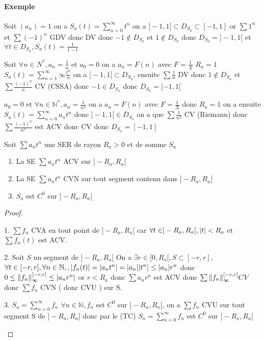 \documentclass[11pt,hidelinks]{book}
\theoremstyle{mytheoremstyle}
\theoremstyle{mytheoremstyle}
\theoremstyle{mytheoremstyle}
\theoremstyle{mytheoremstyle}
\theoremstyle{mytheoremstyle}
\theoremstyle{mytheoremstyle}
\theoremstyle{mytheoremstyle}
\theoremstyle{mytheoremstyle}
\theoremstyle{myproblemstyle}
\def\mbb#1{\mathbb{#1}}
\def\bN{\mbb{N}}
\def\is#1{\sum_{n=0}^\infty #1}
\def\iss#1#2{\sum_{n=#1}^\infty #2}
\def\ser{\sum a_n t^n}
\def\fn{\forall n \in \bN,}
\begin{document}
\begin{adjustwidth}{-2em}{-1em}
    \paragraph{Exemple}
    \begin{ex}
        Soit $(a_n) = 1$ on a $S_a(t) = \is{t^n}$ on a $]-1,1[ \subset D_{S_a} \subset [-1,1]$
        or $\sum 1^n$ et $\sum (-1)^n$ GDV donc DV 
        donc $-1 \not \in D_{S_a}$ et $1 \not \in D_{S_a}$ donc 
        $D_{S_a} = ]-1,1[$ et $\forall t \in D_{S_a}, S_a(t) = \frac{1}{1-t}$
    \end{ex}
    \begin{ex}
        Soit $\forall n \in N^*, a_n = \frac{1}{n}$ et $a_0 = 0$
        on a $a_n = F(n)$ avec $F = \frac{1}{X}$ $R_a = 1$ $S_a(t) = \iss{1}{\infty} \frac{t^n}{n}$ 
        on a $]-1,1[ \subset D_{S_a}$, ensuite $\sum \frac{1}{n}$ DV donc $1 \not \in D_{S_a}$ 
        et $\sum \frac{(-1)^n}{n}$ CV (CSSA) donc $-1 \in D_{S_a}$
        donc $D_{S_a} = [-1,1[$
    \end{ex}
    \begin{ex}
        $a_0 = 0$ et $\forall n \in \bN^*, a_n = \frac{1}{n^2}$
        on a $a_n = F(n)$ avec $F = \frac{1}{X}$ donc $R_a = 1$ 
        on a ensuite $S_a(t) = \is{a_nt^n}$ donc $]-1,1[ \in D_{S_a}$ 
        on a que $\sum \frac{1}{n^2}$ CV (Riemann) donc $\sum \frac{(-1)^n}{n^2}$ est ACV donc CV
        donc $D_{S_a} = [-1,1]$
    \end{ex}
    \begin{theorem}
        Soit $\ser$ une SER de rayon $R_a > 0$ et de somme $S_a$ 
        \begin{enumerate} 
        \item La SE $\ser$ ACV sur $]-R_a,R_a[$ 
        \item La SE $\ser$ CVN sur tout segment contenu dans $]-R_a,R_a[$ 
        \item $S_a$ est $C^0$ sur $]-R_a, R_a[$
        \end{enumerate}
        \begin{proof}
            \begin{enumerate}
            1. $\sum f_n$ CVA en tout point de $]-R_a, R_a[$ car 
            $\forall t \in ]-R_a, R_a[, \abs{t} < R_a$
            et $\sum f_n(t)$ est ACV. 

            2. Soit $S$ un segment de $]-R_a, R_a[$ 
            On a $\exists r \in [0,R_a[, S \subset [-r,r]$, 
            $\forall t \in [-r,r], \fn, \abs{f_n(t)} = \abs{a_nt^n} = \abs{a_n} \abs{t^n} \leq \abs{a_n} r^n$
            donc $0 \leq \norm{f_n}^{[-r,r]}_{\infty} \leq \abs{a_nr^n}$ or $r < R_a$ donc $\sum a_n r^n$ est ACV 
            donc $\sum \norm{f_n}^{[-r,r]}_{\infty} CV$
            donc $\sum f_n$ CVN ( donc CVU ) sur S. 

            3. $S_a = \is{f_n}$ 
            $\fn f_n$ est $C^0$ sur $]-R_a, R_a[$, on a 
            $\sum f_n$ CVU sur tout segment S de $]-R_a, R_a[$ donc par le (TC) 
            $S_a = \is{f_n}$ est $C^0$ sur $]-R_a, R_a[$
            \end{enumerate}
        \end{proof}
    \end{theorem}
\end{adjustwidth}
\newpage
\end{document}
